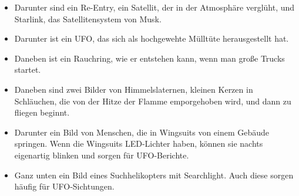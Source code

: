 \documentclass{scrartcl}
\begin{document}
\begin{itemize}
    \begin{figure}[h]
        \centering
        \begin{minipage}[b]{0.45\linewidth}
        \end{minipage}
        \hfill
        \begin{minipage}[b]{0.45\linewidth}
        \end{minipage}
    \end{figure}

    \item Darunter sind ein Re-Entry, ein Satellit, der in der Atmosphäre verglüht, und Starlink, das Satellitensystem von Musk.  
    \item Darunter ist ein UFO, das sich als hochgewehte Mülltüte herausgestellt hat.
    \item Daneben ist ein Rauchring, wie er entstehen kann, wenn man große Trucks startet. 
    \item Daneben sind zwei Bilder von Himmelslaternen, kleinen Kerzen in \frq Schläuchen\flq, die von der Hitze der Flamme emporgehoben wird, und dann zu fliegen beginnt.
    \item Darunter ein Bild von Menschen, die in Wingsuits von einem Gebäude springen. Wenn die Wingsuits LED-Lichter haben, können sie nachts eigenartig blinken und sorgen für UFO-Berichte.
    \item Ganz unten ein Bild eines Suchhelikopters mit Searchlight. Auch diese sorgen häufig für UFO-Sichtungen.
\end{itemize}
\end{document}
